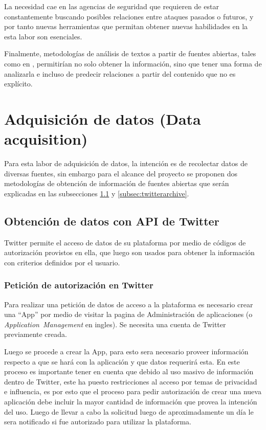 La necesidad cae en las agencias de seguridad que requieren de estar constantemente buscando posibles relaciones entre ataques pasados o futuros, y por tanto nuevas herramientas que permitan obtener nuevas habilidades en la esta labor son esenciales.

Finalmente, metodologías de análisis de textos a partir de fuentes abiertas, tales como en \cite{osint}, permitirían no solo obtener la información, sino que tener una forma de analizarla e incluso de predecir relaciones a partir del contenido que no es explícito.


\section{Adquisición de datos (Data acquisition)} \label{sec:data-acquisition}
Para esta labor de adquisición de datos, la intención es de recolectar datos de diversas fuentes, sin embargo para el alcance del proyecto se proponen dos metodologías de obtención de información de fuentes abiertas que serán explicadas en las subsecciones \ref{subsec:twitterapi} y \ref{subsec:twitterarchive}.

\subsection{Obtención de datos con API de Twitter} \label{subsec:twitterapi}
Twitter permite el acceso de datos de su plataforma por medio de códigos de autorización provistos en ella, que luego son usados para obtener la información con criterios definidos por el usuario.

\subsubsection{Petición de autorización en Twitter}
Para realizar una petición de datos de acceso a la plataforma es necesario crear una ``App'' por medio de visitar la pagina de Administración de aplicaciones  (o \emph{Application~Management} en ingles). Se necesita una cuenta de Twitter previamente creada.

Luego se procede a crear la App, para esto sera necesario proveer información respecto a que se hará con la aplicación y que datos requerirá esta. En este proceso es importante tener en cuenta que debido al uso masivo de información dentro de Twitter, este ha puesto restricciones al acceso por temas de privacidad e influencia, es por esto que el proceso para pedir autorización de crear una nueva aplicación debe incluir la mayor cantidad de información que provea la intención del uso. Luego de llevar a cabo la solicitud luego de aproximadamente un día le sera notificado si fue autorizado para utilizar la plataforma.

